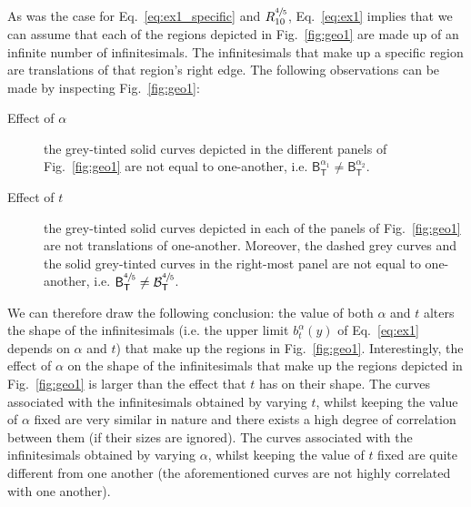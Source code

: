 \documentclass{article}
\theoremstyle{theorem}
\theoremstyle{definition}
\begin{document}
\noindent
As was the case for Eq.~\eqref{eq:ex1_specific} and $R_{10}^{\sfrac{4}{5}}$, Eq.~\eqref{eq:ex1} implies that we can assume that each of the regions depicted in Fig.~\ref{fig:geo1} are made up of an infinite number of infinitesimals. The infinitesimals that make up a specific region are translations of that region's right edge. 
The following observations can be made by inspecting Fig.~\ref{fig:geo1}: 
\begin{description}
 \item[Effect of $\alpha$] the grey-tinted solid curves depicted in the different panels of Fig.~\ref{fig:geo1} are not equal to one-another, i.e. $\mathsf{B}_{\mathsf{T}}^{\alpha_1}\neq\mathsf{B}_{\mathsf{T}}^{\alpha_2}$. 
 \item[Effect of $t$] the grey-tinted solid curves depicted in each of the panels of Fig.~\ref{fig:geo1} are not translations of one-another. Moreover, the dashed grey curves and the solid grey-tinted curves in the right-most panel are not equal to one-another, i.e. $\mathsf{B}_{\mathsf{T}}^{\sfrac{4}{5}}\neq\mathcal{B}_{\mathsf{T}}^{\sfrac{4}{5}}$.
\end{description}
We can therefore draw the following conclusion: the value of both $\alpha$ and $t$ alters the shape of the infinitesimals (i.e. the upper limit $b_{t}^{\alpha}(y)$ of Eq.~\eqref{eq:ex1} depends on $\alpha$ and $t$) that make up the regions in Fig.~\ref{fig:geo1}. Interestingly, the effect of $\alpha$ on the shape of the infinitesimals that make up the regions depicted in Fig.~\ref{fig:geo1} is larger than the effect that $t$ has on their shape. 
The curves associated with the infinitesimals obtained by varying $t$, whilst keeping the value of $\alpha$ fixed are very similar in nature and there exists a high degree of correlation between them (if their 
sizes are ignored). The curves associated with the infinitesimals obtained by varying $\alpha$, whilst keeping the value of $t$ fixed are quite different from one another (the aforementioned curves are not highly correlated with 
one another).\\  

\end{document}
